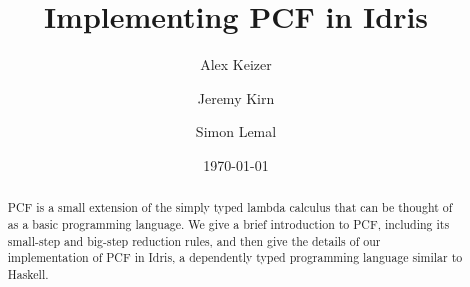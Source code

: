 \documentclass[12pt,a4paper]{article}
\title{Implementing PCF in Idris}
\author{Alex Keizer \and Jeremy Kirn \and Simon Lemal}
\date{\today}
\begin{document}
\maketitle

\begin{abstract}
PCF is a small extension of the simply typed lambda calculus that can be thought of as a basic programming language. We give a brief introduction to PCF, including its small-step and big-step reduction rules, and then give the details of our implementation of PCF in Idris, a dependently typed programming language similar to Haskell.

\end{abstract}


\setcounter{tocdepth}{2}
\tableofcontents









\end{document}
